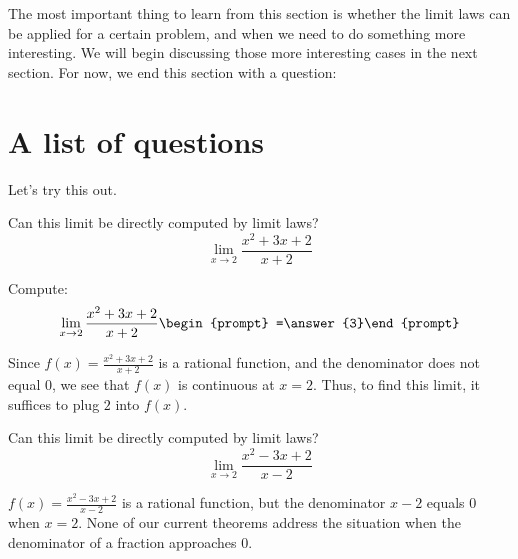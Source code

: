 \documentclass{ximera}
\begin{document}
The most important thing to learn from this section is whether the
limit laws can be applied for a certain problem, and when we need to
do something more interesting.  We will begin discussing those more
interesting cases in the next section.  For now, we end this section
with a question:

\section{A list of questions}

Let's try this out.

\begin{question}
  Can this limit be directly computed by limit laws?
  \[
  \lim_{x\to 2}\frac{x^2+3x+2}{x+2} 
  \]
  \begin{multipleChoice}
  \end{multipleChoice}
  \begin{question}
    Compute:
    \[
    \lim_{x\to 2}\frac{x^2+3x+2}{x+2}\begin{prompt} =\answer{3}\end{prompt}
    \]
    \begin{feedback}
      Since $f(x)=\frac{x^2+3x+2}{x+2}$ is a rational function, and
      the denominator does not equal $0$, we see that $f(x)$ is
      continuous at $x=2$.  Thus, to find this limit, it suffices to
      plug $2$ into $f(x)$.
    \end{feedback}
  \end{question}
\end{question}


\begin{question}
  Can this limit be directly computed by limit laws?
  \[
  \lim_{x\to 2}\frac{x^2-3x+2}{x-2}
  \]
  \begin{multipleChoice}
  \end{multipleChoice}
  \begin{feedback}
    $f(x) = \frac{x^2-3x+2}{x-2}$ is a rational function, but the
    denominator $x-2$ equals $0$ when $x=2$. None of our current
    theorems address the situation when the denominator of a fraction
    approaches $0$.
  \end{feedback}
\end{question}
\end{document}
